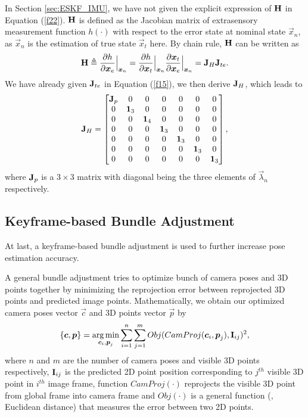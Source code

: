 In Section \ref{sec:ESKF_IMU}, we have not given the explicit expression of $\mathbf{H}$ in Equation (\ref{f22}). $\mathbf{H}$ is defined as the Jacobian matrix of extrasensory measurement function $h(\cdot)$ with respect to the error state at nominal state $\vec{x}_n$, as $\vec{x}_n$ is the estimation of true state $\vec{x}_t$ here. By chain rule, $\mathbf{H}$ can be written as
\begin{equation}
	\mathbf{H} \triangleq \frac{\partial{h}}{\partial{\boldsymbol{x}_e}}\Bigr|_{\boldsymbol{x}_n} = \frac{\partial{h}}{\partial{\boldsymbol{x}_t}}\Bigr|_{\boldsymbol{x}_n}\frac{\partial{\boldsymbol{x}_t}}{\partial{\boldsymbol{x}_e}}\Bigr|_{\boldsymbol{x}_n} = \mathbf{J}_H\mathbf{J}_{t e}.
\end{equation}
We have already given $\mathbf{J}_{t e}$ in Equation (\ref{f15}), we then derive $\mathbf{J}_H$, which leads to
\begin{equation}
	\mathbf{J}_H = \begin{bmatrix}
	\mathbf{J}_p & 0 & 0 & 0 & 0 & 0 & 0\\
	0 & \mathbf{1}_3 &0 & 0 & 0 & 0 & 0\\
	0 & 0 & \mathbf{1}_4 & 0 & 0 & 0 & 0\\
	0 & 0 & 0 & \mathbf{1}_3 & 0 & 0 & 0\\
	0 & 0 & 0 & 0 & \mathbf{1}_3 & 0 & 0\\
	0 & 0 & 0 & 0 & 0 & \mathbf{1}_3 & 0\\
	0 & 0 & 0 & 0 & 0 & 0 & \mathbf{1}_3 \\
	\end{bmatrix},
\end{equation}
where $\mathbf{J}_p$ is a $3 \times 3$ matrix with diagonal being the three elements of $\vec{\lambda}_n$ respectively.

\subsection{Keyframe-based Bundle Adjustment}
\label{subsec:camera_comple_data_sub3}

At last, a keyframe-based bundle adjustment is used to further increase pose estimation accuracy.

A general bundle adjustment tries to optimize bunch of camera poses and 3D points together by minimizing the reprojection error between reprojected 3D points and predicted image points. Mathematically, we obtain our optimized camera poses vector $\vec{c}$ and 3D points vector $\vec{p}$ by
\begin{equation}\label{c1}
	\{ \boldsymbol{c}, \boldsymbol{p} \} = \mathop{\rm arg\,min}\limits_{\boldsymbol{c}_i, \boldsymbol{p}_j} \sum_{i=1}^n \sum_{j=1}^m Obj(CamProj(\boldsymbol{c}_i, \boldsymbol{p}_j), \mathbf{I}_{ij})^2,
\end{equation}
where $n$ and $m$ are the number of camera poses and visible 3D points respectively, $\mathbf{I}_{ij}$ is the predicted 2D point position corresponding to $j^{th}$ visible 3D point in $i^{th}$ image frame, function $CamProj(\cdot)$ reprojects the visible 3D point from global frame into camera frame and $Obj(\cdot)$ is a general function (\eg, Euclidean distance) that measures the error between two 2D points.

